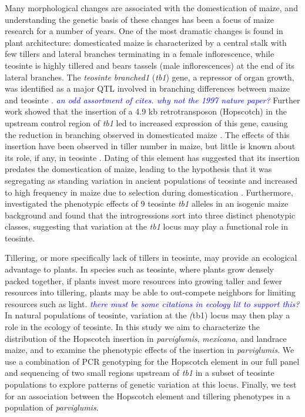 \documentclass[12pt]{article}
\newcommand{\jri}[1]{\textcolor{blue}{ \emph{\scriptsize  #1}} }
\begin{document}
Many morphological changes are associated with the domestication of maize, and understanding the genetic basis of these changes has been a focus of maize research for a number of years\citep{Doebley2004}. One of the most dramatic changes is found in plant architecture: domesticated maize is characterized by a central stalk with few tillers and lateral branches terminating in a female inflorescence, while teosinte is highly tillered and bears tassels (male inflorescences) at the end of its lateral branches. The \emph{teosinte branched1} (\emph{tb1}) gene, a repressor of organ growth, was identified as a major QTL involved in branching differences between maize and teosinte \citep{Doebley1990, DoebleyStec1991, LukensDoebley1999}. \jri{an odd assortment of cites. why not the 1997 nature paper?} Further work showed that the insertion of a 4.9 kb retrotransposon (Hopscotch) in the upstream control region of \emph{tb1} led to increased expression of this gene, causing the reduction in branching observed in domesticated maize \cite{Studer2011}. The effects of this insertion have been observed in tiller number in maize, but little is known about its role, if any, in teosinte \citep{Studer2011}. Dating of this element has suggested that its insertion predates the domestication of maize, leading to the hypothesis that it was segregating as standing variation in ancient populations of teosinte and increased to high frequency in maize due to selection during domestication \citep{Studer2011}. Furthermore, \citep{StuderDoebley2012} investigated the phenotypic effects of 9 teosinte \emph{tb1} alleles in an isogenic maize background and found that the introgressions sort into three distinct phenotypic classes, suggesting that variation at the \emph{tb1} locus may play a functional role in teosinte.

Tillering, or more specifically lack of tillers in teosinte, may provide an ecological advantage to plants. In species such as teosinte, where plants grow densely packed together, if plants invest more resources into growing taller and fewer resources into tillering, plants may be able to out-compete neighbors for limiting resources such as light. \jri{there must be some citations in ecology lit to support this?} In natural populations of teosinte, variation at the \emph(tb1) locus may then play a role in the ecology of teosinte.  In this study we aim to characterize the distribution of the Hopscotch insertion in \emph{parviglumis}, \emph{mexicana}, and landrace maize, and to examine the phenotypic effects of the insertion in \emph{parviglumis}. We use a combination of PCR genotyping for the Hopscotch element in our full panel and sequencing of two small regions upstream of \emph{tb1} in a subset of teosinte populations to explore patterns of genetic variation at this locus. Finally, we test for an association between the Hopscotch element and tillering phenotypes in a population of \emph{parviglumis}.
\end{document}
